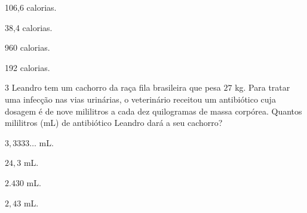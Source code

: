 {{\begin{escolha}[itemsep=0pt]
\item 106,6 calorias.
\item 38,4 calorias.
\item 960 calorias.
\item 192 calorias.
\end{escolha}











\num{3} Leandro tem um cachorro da raça fila brasileira que pesa $27$ kg. Para
tratar uma infecção nas vias urinárias, o veterinário receitou um
antibiótico cuja dosagem é de nove mililitros a cada dez quilogramas de massa corpórea.
Quantos mililitros (mL) de antibiótico Leandro dará a seu cachorro?

\begin{escolha}[itemsep=0pt]
\item $3,3333\ldots$ mL.
\item $24,3$ mL.
\item $2.430$ mL.
\item $2,43$ mL.
\end{escolha}


}}
